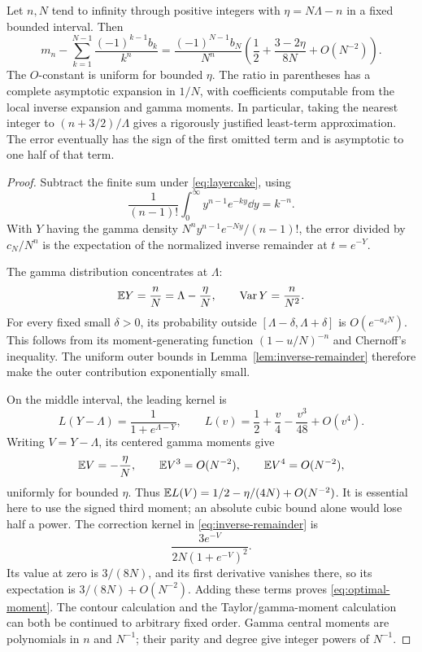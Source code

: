 \begin{theorem}\label{thm:optimal-moment}
Let \(n,N\) tend to infinity through positive integers with
\(\eta=N\Lambda-n\) in a fixed bounded interval. Then
\begin{equation}\label{eq:optimal-moment}
 \boxed{\displaystyle
 m_n-\sum_{k=1}^{N-1}\frac{(-1)^{k-1}b_k}{k^n}
 =\frac{(-1)^{N-1}b_N}{N^n}
 \left(\frac12+\frac{3-2\eta}{8N}+O(N^{-2})\right).}
\end{equation}
The \(O\)-constant is uniform for bounded \(\eta\).
The ratio in parentheses has a complete asymptotic expansion in
\(1/N\), with coefficients computable from the local inverse expansion
and gamma moments.
In particular, taking the nearest integer to \((n+3/2)/\Lambda\)
gives a rigorously justified least-term approximation. The error
eventually has the sign of the first omitted term and is asymptotic
to one half of that term.
\end{theorem}

\begin{proof}
Subtract the finite sum under \eqref{eq:layercake}, using
\[
 \frac1{(n-1)!}\int_0^\infty y^{n-1}e^{-ky}\dd y=k^{-n}.
\]
With \(Y\) having the gamma density
\(N^ny^{n-1}e^{-Ny}/(n-1)!\), the error divided by \(c_N/N^n\) is
the expectation of the normalized inverse remainder at \(t=e^{-Y}\).

The gamma distribution concentrates at \(\Lambda\):
\[
 \mathbb E Y=\frac nN=\Lambda-\frac\eta N,\qquad
 \operatorname{Var}Y=\frac n{N^2}.
\]
For every fixed small \(\delta>0\), its probability outside
\([\Lambda-\delta,\Lambda+\delta]\) is \(O(e^{-a_\delta N})\).
This follows from its moment-generating function
\((1-u/N)^{-n}\) and Chernoff's inequality.
The uniform outer bounds in Lemma~\ref{lem:inverse-remainder}
therefore make the outer contribution exponentially small.

On the middle interval, the leading kernel is
\[
 L(Y-\Lambda)=\frac1{1+e^{\Lambda-Y}},\qquad
 L(v)=\frac12+\frac v4-\frac{v^3}{48}+O(v^4).
\]
Writing \(V=Y-\Lambda\), its centered gamma moments give
\[
 \mathbb E V=-\frac\eta N,\qquad
 \mathbb E V^3=O(N^{-2}),\qquad \mathbb E V^4=O(N^{-2}),
\]
uniformly for bounded \(\eta\). Thus
\(\mathbb E L(V)=1/2-\eta/(4N)+O(N^{-2})\).
It is essential here to use the signed third moment; an absolute
cubic bound alone would lose half a power.
The correction kernel in \eqref{eq:inverse-remainder} is
\[
 \frac{3e^{-V}}{2N(1+e^{-V})^2}.
\]
Its value at zero is \(3/(8N)\), and its first derivative vanishes
there, so its expectation is \(3/(8N)+O(N^{-2})\).
Adding these terms proves \eqref{eq:optimal-moment}.
The contour calculation and the Taylor/gamma-moment calculation can
both be continued to arbitrary fixed order. Gamma central moments
are polynomials in \(n\) and \(N^{-1}\); their parity and degree give
integer powers of \(N^{-1}\).
\end{proof}

